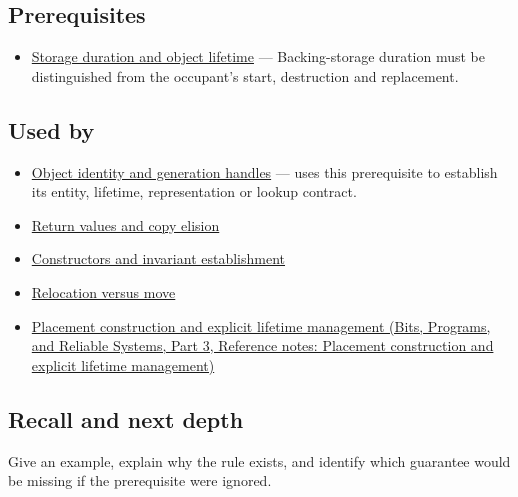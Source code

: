 \subsection{Prerequisites}\label{appendix-a82f9c438857-prerequisites}

\hypertarget{appendix-a82f9c438857-prerequisites}{}

\begin{itemize}
\tightlist
\item
  \hyperref[appendix-0b104bcba06b]{Storage duration and object lifetime} --- Backing-storage duration must be distinguished from the occupant's start, destruction and replacement.
\end{itemize}

\subsection{Used by}\label{appendix-a82f9c438857-used-by}

\hypertarget{appendix-a82f9c438857-used-by}{}

\begin{itemize}
\tightlist
\item
  \hyperref[appendix-f1581457d322]{Object identity and generation handles} --- uses this prerequisite to establish its entity, lifetime, representation or lookup contract.
\item
  \hyperref[appendix-b08d3788c5c6]{Return values and copy elision}
\item
  \hyperref[appendix-7f8ec83d0886]{Constructors and invariant establishment}
\item
  \hyperref[appendix-adfd6397af8d]{Relocation versus move}
\item
  \href{../01-Bits-Programs-and-Reliable-Systems-P03/main.pdf\#nameddest=appendix-f56c3e43fd4e}{Placement construction and explicit lifetime management (Bits, Programs, and Reliable Systems, Part 3, Reference notes: Placement construction and explicit lifetime management)}
\end{itemize}

\subsection{Recall and next depth}\label{appendix-a82f9c438857-recall-and-next-depth}

\hypertarget{appendix-a82f9c438857-recall-and-next-depth}{}

Give an example, explain why the rule exists, and identify which guarantee would be missing if the prerequisite were ignored.

